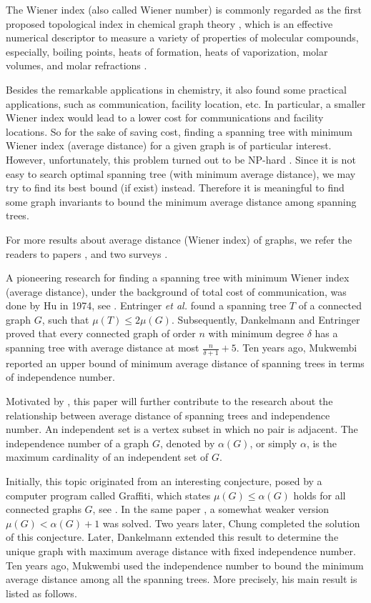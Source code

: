 \documentclass[12pt]{article}
\begin{document}
The Wiener index (also called Wiener number) is commonly regarded as the first proposed topological index in chemical graph theory \cite{GuPo86}, which is an effective numerical descriptor to measure a variety of properties of molecular compounds, especially, boiling points, heats of formation, heats of vaporization,
molar volumes, and molar refractions \cite{NiTrMi95}.


Besides the remarkable applications in chemistry, it also found some practical applications, such as communication, facility location, etc. In particular, a smaller Wiener index would lead to a lower cost for communications and facility locations. So for the sake of saving cost, finding a spanning tree with minimum Wiener index (average distance) for a given graph is of particular interest. However, unfortunately, this problem turned out to be NP-hard \cite{JoLeKa78}. Since it is not easy to search optimal spanning tree (with minimum average distance), we may try to find its best bound (if exist) instead. Therefore it is meaningful to find some graph invariants to bound the minimum average distance among spanning trees.

For more results about average distance (Wiener index) of graphs, we refer the readers to papers \cite{BeRiSm01,Chen23,Da12,DaOeWe04,DePeWa09,DuZh10,Hen86,YeGu94}, and two surveys \cite{DoEnGu01,Ple84}.

A pioneering research for finding a spanning tree with minimum Wiener index (average distance), under the background of total cost of communication, was done by Hu in 1974, see \cite{Hu74}. Entringer {\it et al.} \cite{EnKlSz96} found a spanning tree $T$ of a connected graph $G$, such that $\mu(T) \le 2\mu (G)$. Subsequently,
Dankelmann and Entringer \cite{DaEn00} proved that every connected graph of order $n$ with minimum degree $\delta$ has a spanning tree with average distance at most $\frac{n}{\delta + 1} + 5$.
Ten years ago, Mukwembi \cite{Muk14} reported an upper bound of minimum average distance of spanning trees in terms of independence number.



Motivated by \cite{Muk14}, this paper will further contribute to the research about the relationship between average distance of spanning trees and independence number. An independent set is a vertex subset in which no pair is adjacent.
The independence number of a graph $G$, denoted by $\alpha(G)$, or simply $\alpha$, is
the maximum cardinality of an independent set of $G$.

Initially, this topic originated from an interesting conjecture, posed by a computer program called Graffiti, which states $\mu (G) \le \alpha (G)$ holds for all connected graphs $G$, see \cite{FaWa86,FaWa87}. In the same paper \cite{FaWa86}, a somewhat weaker version $\mu (G) < \alpha (G) + 1$ was solved. Two years later, Chung \cite{Chu88} completed the solution of this conjecture. Later, Dankelmann \cite{Dan94} extended this result to determine the unique graph with maximum average distance with fixed independence number.
Ten years ago, Mukwembi \cite{Muk14} used the independence number to bound the minimum average distance among all the spanning trees.
More precisely, his main result is listed as follows.
\end{document}
